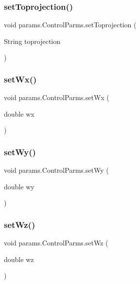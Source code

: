 \subsubsection{\texorpdfstring{set\+Toprojection()}{setToprojection()}}
{\footnotesize\ttfamily void params.\+Control\+Parms.\+set\+Toprojection (\begin{DoxyParamCaption}\item[{String}]{toprojection }\end{DoxyParamCaption})}

\mbox{\label{classparams_1_1_control_parms_a997a3be490eaf52c7a3a24c7e459debe}} 
\subsubsection{\texorpdfstring{set\+Wx()}{setWx()}}
{\footnotesize\ttfamily void params.\+Control\+Parms.\+set\+Wx (\begin{DoxyParamCaption}\item[{double}]{wx }\end{DoxyParamCaption})}

\mbox{\label{classparams_1_1_control_parms_a62167ea52e9ae9c67bdd7f01d84d9338}} 
\subsubsection{\texorpdfstring{set\+Wy()}{setWy()}}
{\footnotesize\ttfamily void params.\+Control\+Parms.\+set\+Wy (\begin{DoxyParamCaption}\item[{double}]{wy }\end{DoxyParamCaption})}

\mbox{\label{classparams_1_1_control_parms_a79521a33aa8a2e38aba29e77ce052714}} 
\subsubsection{\texorpdfstring{set\+Wz()}{setWz()}}
{\footnotesize\ttfamily void params.\+Control\+Parms.\+set\+Wz (\begin{DoxyParamCaption}\item[{double}]{wz }\end{DoxyParamCaption})}

